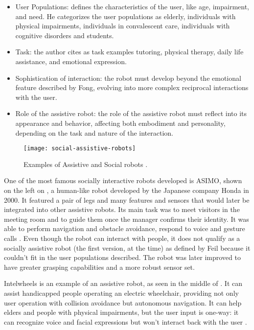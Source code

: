 \begin{itemize}
    \item User Populations: defines the characteristics of the user, like age, impairment, and need. He categorizes the user populations as elderly, individuals with physical impairments, individuals in convalescent care, individuals with cognitive disorders and students.
    \item Task: the author cites as task examples tutoring, physical therapy, daily life assistance, and emotional expression.
    \item Sophistication of interaction: the robot must develop beyond the emotional feature described by Fong, evolving into more complex reciprocal interactions with the user.
    \item Role of the assistive robot: the role of the assistive robot must reflect into its appearance and behavior, affecting both embodiment and personality, depending on the task and nature of the interaction.
\end{itemize}

\begin{figure}[!ht]
    \centering
    \texttt{[image: social-assistive-robots]}
    \caption{Examples of Assistive and Social robots \cite{sakagami2002intelligent,braga2008intellwheels,tanaka2015pepper}.}
    \label{fig:social-assistive-robots}
\end{figure}

One of the most famous socially interactive robots developed is ASIMO, shown on the left on , a human-like robot developed by the Japanese company Honda in 2000. It featured a pair of legs and many features and sensors that would later be integrated into other assistive robots. Its main task was to meet visitors in the meeting room and to guide them once the manager confirms their identity. It was able to perform navigation and obstacle avoidance, respond to voice and gesture calls \cite{sakagami2002intelligent}. Even though the robot can interact with people, it does not qualify as a socially assistive robot (the first version, at the time) as defined by Feil because it couldn't fit in the user populations described. The robot was later improved to have greater grasping capabilities and a more robust sensor set.

Intelwheels is an example of an assistive robot, as seen in the middle of . It can assist handicapped people operating an electric wheelchair, providing not only user operation with collision avoidance but autonomous navigation. It can help elders and people with physical impairments, but the user input is one-way: it can recognize voice and facial expressions but won't interact back with the user \cite{braga2008intellwheels}.

